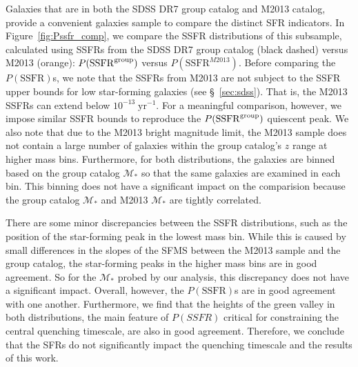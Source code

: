 Galaxies that are in both the SDSS DR7 group catalog and 
M2013 catalog, provide a convenient galaxies sample
to compare the distinct SFR indicators. In Figure~\ref{fig:Pssfr_comp}, 
we compare the SSFR distributions of this subsample, 
calculated using SSFRs from the SDSS DR7 group catalog (black dashed) 
versus M2013 (orange): $P(\mathrm{SSFR}^{\rm group})$ versus 
$P(\mathrm{SSFR}^{M2013})$. Before comparing the 
$P(\mathrm{SSFR})$s, we note that the SSFRs from M2013 are 
not subject to the \cite{Brinchmann:2004aa} SSFR upper bounds 
for low star-forming galaxies (see \S~\ref{sec:sdss}). 
That is, the M2013 SSFRs can extend
below $10^{-13}\;\mathrm{yr}^{-1}$. For a meaningful comparison, 
however, we impose similar SSFR bounds to reproduce the 
$P(\mathrm{SSFR}^{\rm group})$ quiescent peak. We also note 
that due to the M2013 bright magnitude limit, the M2013 sample 
does not contain a large number of galaxies within the group 
catalog's $z$ range at higher mass bins. Furthermore, for
both distributions, the galaxies are binned based on the
group catalog $\mathcal{M}_*$ so that the same galaxies are
examined in each bin. This binning does not have a significant
impact on the comparision because the group catalog $\mathcal{M}_*$ 
and M2013 $\mathcal{M}_*$ are tightly correlated. 

There are some minor discrepancies between the SSFR distributions, 
such as the position of the star-forming peak in the lowest mass 
bin. While this is caused by small
differences in the slopes of the SFMS between the M2013 sample 
and the group catalog, the star-forming peaks in the higher mass bins are 
in good agreement. So for the $\mathcal{M}_*$ probed by our analysis, 
this discrepancy does not have a significant impact. Overall, however, 
the $P(\mathrm{SSFR})$s are in good agreement with one another. 
Furthermore, we find that the heights of the green valley in both 
distributions, the main feature of $P(SSFR)$ critical for 
constraining the central quenching timescale, are also in good 
agreement. Therefore, we conclude that the \cite{Brinchmann:2004aa} SFRs
do not significantly impact the quenching timescale and the results of
this work. 


